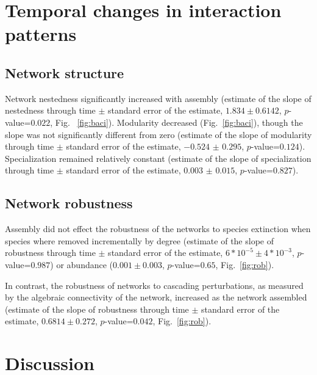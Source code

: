 \documentclass[12pt]{article}
\begin{document}
\section*{Temporal changes in interaction patterns}
\subsection*{Network structure}
Network nestedness significantly increased with assembly (estimate of
the slope of nestedness through time $\pm$ standard error of the
estimate, $1.834 \pm 0.6142$, $p$-value=$0.022$, Fig.~
\ref{fig:baci}).  Modularity decreased (Fig.~\ref{fig:baci}), though
the slope was not significantly different from zero (estimate of the
slope of modularity through time $\pm$ standard error of the estimate,
$-0.524$ $\pm$ $0.295$, $p$-value=$0.124$). Specialization remained
relatively constant (estimate of the slope of specialization through time
$\pm$ standard error of the estimate, $0.003$ $\pm$ $0.015$,
$p$-value=$0.827$).

\subsection*{Network robustness}
Assembly did not effect the robustness of the networks to species
extinction when species where removed incrementally by degree
(estimate of the slope of robustness through time $\pm$ standard error
of the estimate, $6*10^{-5} \pm 4*10^{-3}$, $p$-value=$0.987$) or
abundance ($0.001 \pm 0.003$, $p$-value=$0.65$, Fig.~\ref{fig:rob}).

In contrast, the robustness of networks to cascading perturbations, as
measured by the algebraic connectivity of the network, increased as
the network assembled (estimate of the slope of robustness through
time $\pm$ standard error of the estimate, $0.6814 \pm 0.272$,
$p$-value=$0.042$, Fig.~\ref{fig:rob}).


\section*{Discussion}
\label{sec:discussion}
\end{document}

